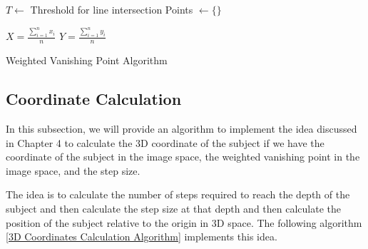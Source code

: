 \documentclass[12pt]{report}
\begin{document}
\begin{algorithm}[H]
    \label{Weighted Vanishing Point Algorithm}

\SetAlgoLined
{}

$T \leftarrow$ Threshold for line intersection\;
Points $\leftarrow \{\}$\;

    
    
    $X = \frac{\sum_{i=1}^{n} x_i}{n}$\;
    $Y = \frac{\sum_{i=1}^{n} y_i}{n}$\;
    
    \caption{Weighted Vanishing Point Algorithm}
    \end{algorithm}
    
    \newpage

    \subsection{Coordinate Calculation}

    In this subsection, we will provide an algorithm to implement the idea discussed in Chapter 4 to calculate the 3D coordinate of the subject if we have the coordinate of the subject in the image space, the weighted vanishing point in the image space, and the step size.\newline

    The idea is to calculate the number of steps required to reach the depth of the subject and then calculate the step size at that depth and then calculate the position of the subject relative to the origin in 3D space. The following algorithm \ref{3D Coordinates Calculation Algorithm} implements this idea.\newline
    
\end{document}
